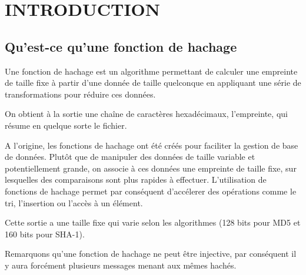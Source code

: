 \documentclass[10.5pt, a4paper, twoside, openright]{report}
\begin{document}
\chapter{INTRODUCTION}
\section{Qu’est-ce qu’une fonction de hachage}
Une fonction de hachage est un algorithme permettant de calculer une empreinte de taille fixe à partir d’une donnée de taille quelconque en appliquant une série de transformations pour réduire ces données.

On obtient à la sortie une chaîne de caractères hexadécimaux, l'empreinte, qui résume en quelque sorte le fichier. 

A l’origine, les fonctions de hachage ont été créés pour faciliter la gestion de base de données. Plutôt que de manipuler des données de taille variable et potentiellement grande, on associe à ces données une empreinte de taille fixe, 
sur lesquelles des comparaisons sont plus rapides à effectuer. L’utilisation de fonctions de hachage permet par conséquent d’accélerer des opérations comme le tri, l’insertion ou l’accès à un élément.

Cette sortie a une taille fixe qui varie selon les algorithmes (128 bits pour MD5 et 160 bits pour SHA-1). 

Remarquons qu'une fonction de hachage  ne peut être injective, par conséquent il y aura forcément plusieurs messages menant aux mêmes hachés.
\end{document}
